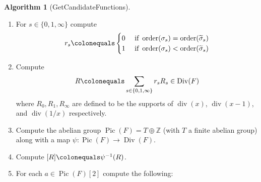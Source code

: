 \documentclass{dcthesis}
\newcommand{\ZZ}{\mathbb Z}
\newcommand{\mm}[1]{{\color{blue} \sf MM: [#1]}}
\newcommand{\wt}[1]{\widetilde{#1}}
\newcommand{\FF}{\mathbb{F}}
\DeclareMathOperator{\Div}{Div}
\DeclareMathOperator{\Pic}{Pic}
\DeclareMathOperator{\ddiv}{div}
\DeclareMathOperator{\order}{order}
\DeclareMathOperator{\Gal}{Gal}
\numberwithin{equation}{section}
\theoremstyle{definition}
\newtheorem{alg}[equation]{Algorithm}
\theoremstyle{remark}
\begin{document}
{{{\begin{alg}[GetCandidateFunctions]
      \begin{enumerate}
        \item\label{alg:gencandidates_setup}
          For $s\in\{0,1,\infty\}$
          compute
          \begin{align}
            \label{eqn:ramcoeffs}
            r_s\colonequals
            \begin{cases}
              0&
              \text{ if }
              \order(\sigma_s)=
              \order(\wt{\sigma}_s)\\
              1&
              \text{ if }
              \order(\sigma_s)<
              \order(\wt{\sigma}_s)\\
            \end{cases}
          \end{align}
        \item\label{alg:getcandidates_getram}
          Compute
          \begin{equation}
            \label{eqn:ramdivisor}
            R\colonequals
            \sum_{s\in\{0,1,\infty\}}r_sR_s
            \in\Div(F)
          \end{equation}
          where
          $R_0,R_1,R_\infty$
          are defined to be the supports
          of
          $\ddiv(x)$,
          $\ddiv(x-1)$,
          and $\ddiv(1/x)$
          respectively.
        \item\label{alg:getcandidates_Pic}
          Compute the abelian group
          $\Pic(F)=T\oplus\ZZ$
          (with $T$ a finite abelian group)
          along with a map
          $\psi\colon\Pic(F)\to\Div(F)$.
        \item\label{alg:getcandidates_PicR}
          Compute
          $[R]\colonequals\psi^{-1}(R)$.
        \item\label{alg:getcandidates_Pic2}
          For each $a\in\Pic(F)[2]$ compute the
          following:
          \begin{enumerate}

\end{enumerate}
\end{enumerate}
\end{alg}}}}
\end{document}

